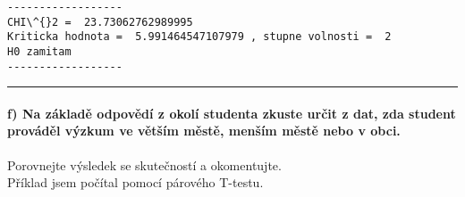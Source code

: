 \documentclass[11pt]{article}
\begin{document}
    \begin{Verbatim}[commandchars=\\\{\}]
------------------
CHI\^{}2 =  23.73062762989995
Kriticka hodnota =  5.991464547107979 , stupne volnosti =  2
H0 zamitam
------------------
    \end{Verbatim}

    \begin{center}\rule{0.5\linewidth}{0.5pt}\end{center}

\hypertarget{f-na-zuxe1kladux11b-odpovux11bduxed-z-okoluxed-studenta-zkuste-urux10dit-z-dat-zda-student-provuxe1dux11bl-vuxfdzkum-ve-vux11btux161uxedm-mux11bstux11b-menux161uxedm-mux11bstux11b-nebo-v-obci.}{%
\paragraph{f) Na základě odpovědí z okolí studenta zkuste určit z dat,
zda student prováděl výzkum ve větším městě, menším městě nebo v
obci.}\label{f-na-zuxe1kladux11b-odpovux11bduxed-z-okoluxed-studenta-zkuste-urux10dit-z-dat-zda-student-provuxe1dux11bl-vuxfdzkum-ve-vux11btux161uxedm-mux11bstux11b-menux161uxedm-mux11bstux11b-nebo-v-obci.}}

Porovnejte výsledek se skutečností a okomentujte.\\
Příklad jsem počítal pomocí párového T-testu.
\end{document}
